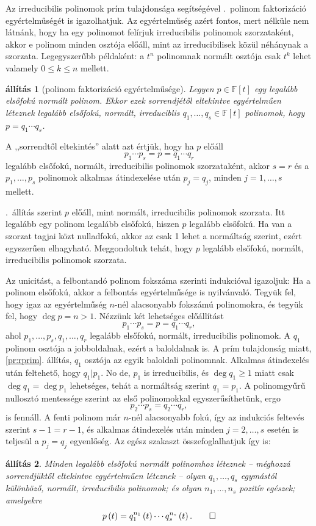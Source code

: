 \documentclass[a4paper, showtrims]{memoir}
\makeatletter
\renewenvironment{proof}[1][\proofname]
    {\par\pushQED{\qed}%
    \normalfont \topsep6\p@\@plus6\p@\relax
    \trivlist
    \item[\hskip\labelsep
        \itshape
    #1\@addpunct{:}]\ignorespaces}
    {\popQED\endtrivlist\@endpefalse}
\theoremstyle{plain}
\newtheorem{proposition}{állítás}[chapter]
\theoremstyle{remark}
\theoremstyle{definition}
\makeatother
\begin{document}
Az irreducibilis polinomok prím tulajdonsága segítségével .~polinom faktorizáció egyértelműségét is igazolhatjuk.
Az egyértelműség azért fontos,
mert nélküle nem látnánk, hogy ha egy polinomot felírjuk irreducibilis polinomok szorzataként, 
akkor e polinom minden osztója előáll, mint az irreducibilisek közül néhánynak a szorzata.
Legegyszerűbb példaként: a \(t^n\) polinomnak normált osztója csak \(t^k\) lehet valamely 
\(0\leq k\leq n\) mellett.
\begin{proposition}[polinom faktorizáció egyértelműsége]\label{pr:polfactunicitas}
	Legyen $p \in\mathbb{F}\left[ t \right]$ egy legalább elsőfokú normált polinom.
	Ekkor ezek sorrendjétől eltekintve egyértelműen léteznek legalább elsőfokú, normált, irreduciblis $q_1,\ldots,q_s\in\mathbb{F}\left[ t \right]$ polinomok,
	hogy $p=q_1\cdots q_s$.
\end{proposition}
A ,,sorrendtől eltekintés'' alatt azt értjük, hogy ha $p$ előáll
\[
	p_1\cdots p_s=p=q_1\cdots q_r
\]
legalább elsőfokú, normált, irreducibilis polinomok szorzataként,
akkor $s=r$ és a $p_1,\ldots,p_s$ polinomok alkalmas átindexelése után $p_j=q_j$,
minden $j=1,\ldots,s$ mellett.
\begin{proof}
    .~állítás
	szerint $p$ előáll, mint normált, irreducibilis polinomok szorzata.
	Itt legalább egy polinom legalább elsőfokú, hiszen $p$ legalább elsőfokú.
	Ha van a szorzat tagjai közt nulladfokú, akkor az csak 1 lehet a normáltság szerint,
	ezért egyszerűen elhagyható.
	Meggondoltuk tehát, hogy $p$ legalább elsőfokú, normált, irreducibilis polinomok szorzata.

	Az unicitást,
	a felbontandó polinom fokszáma szerinti indukcióval igazoljuk:
	Ha a polinom elsőfokú, akkor a felbontás egyértelműsége is nyilvánvaló.
	Tegyük fel, hogy igaz az egyértelműség $n$-nél alacsonyabb fokszámú polinomokra,
	és tegyük fel, hogy $\deg p=n>1$.
	Nézzünk két lehetséges előállítást
	\[
		p_1\cdots p_s=p=q_1\cdots q_r,
	\]
	ahol $p_1,\ldots,p_s,q_1,\ldots,q_r$ legalább elsőfokú, normált, irreducibilis polinomok.
	A $q_1$ polinom osztója a jobboldalnak, ezért a baloldalnak is.
	A prím tulajdonság miatt, \ref{pr:rprim}. állítás, $q_1$ osztója az egyik baloldali polinomnak.
	Alkalmas átindexelés után feltehető, hogy $q_1|p_1$.
	No de, $p_1$ is irreducibilis, és $\deg q_1\geq 1$ miatt csak $\deg q_1=\deg p_1$ lehetséges,
	tehát a normáltság szerint $q_1=p_1$.
	A polinomgyűrű nullosztó mentessége szerint az első polinomokkal egyszerűsíthetünk, ergo
	\[
		p_2\cdots p_s=q_2\cdots q_r,
	\]
	is fennáll.
	A fenti polinom már $n$-nél alacsonyabb fokú,
	így az indukciós feltevés szerint $s-1=r-1$,
	és alkalmas átindexelés után minden $j=2,\ldots,s$ esetén is teljesül a $p_j=q_j$ egyenlőség.
\end{proof}
Az egész szakaszt összefoglalhatjuk így is:
\begin{proposition}
	Minden legalább elsőfokú normált polinomhoz léteznek
	--
	méghozzá sorrendjüktől eltekintve egyértelműen léteznek
	--
	olyan $q_1,\ldots,q_s$ egymástól különböző, normált, irreducibilis polinomok;
	és olyan $n_1,\ldots,n_s$ pozitív egészek;
	amelyekre
	\[
		p\left( t \right)
		=
		q_1^{n_1}\left( t \right)\cdots q_s^{n_s}\left( t \right).\qedhere
	\]
\end{proposition}
\end{document}
